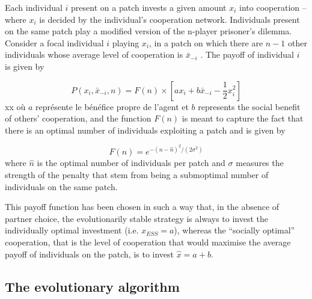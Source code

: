 \documentclass[twocolumn]{article}
\begin{document}
Each individual $i$ present on a patch invests a given amount $x_i$ into cooperation --where $x_i$ is decided by the individual's cooperation network. Individuals present on the same patch play a modified version of the n-player prisoner's dilemma. Consider a focal individual $i$ playing $x_i$, in a patch on which there are $n-1$ other individuals whose average level of cooperation is $\bar{x}_{-i}$ . The payoff of individual $i$ is given by

\begin{equation}
P(x_i, \bar{x}_{-i}, n) = F(n)  \times  \left[ a x_{i} +  b  \bar{x}_{-i} - \frac{1}{2}  x_i^2\right]
\end{equation}
xx où $a$ représente le bénéfice propre de l'agent et $b$ represents the social benefit of others' cooperation, and the function $F(n)$ is meant to capture the fact that there is an optimal number of individuals exploiting a patch and is given by

\begin{equation}
F(n) = e^{ - \left( {n - \hat{n} } \right)^2  / (2\sigma^2) } \label{eq:friction}
\end{equation}where $\hat{n}$ is the optimal number of individuals per patch and $\sigma$ measures the strength of the penalty that stem from being a submoptimal number of individuals on the same patch.

This payoff function has been chosen in such a way that, in the absence of partner choice, the evolutionarily stable strategy is always to invest the individually optimal investment (i.e. $x_{ESS} = a$), whereas the ``socially optimal'' cooperation, that is the level of cooperation that would maximise the average payoff of individuals on the patch, is to invest $\hat{x} = a + b$.






\subsection{The evolutionary algorithm}\label{sec:evolutionaryalgo}
\end{document}
